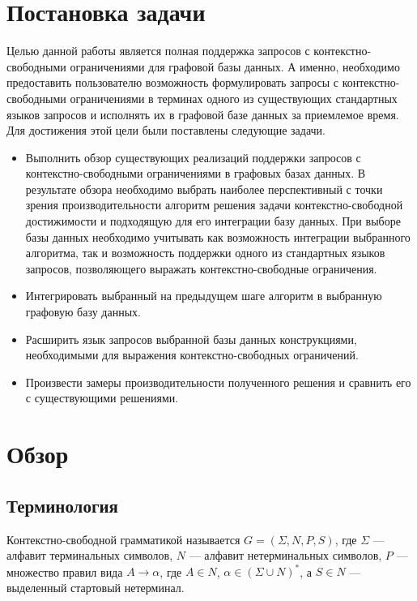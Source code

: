\documentclass[14pt]{matmex-diploma-custom}
\newcommand{\gsv}[1]{\textcolor{red}{#1$^{\text{gsv}}$}}
\begin{document}
\section{Постановка задачи}
Целью данной работы является полная поддержка запросов с конте\-кстно-свободными ограничениями для графовой базы данных. А именно, необходимо предоставить пользователю возможность формулировать запросы с контекстно-свободными ограничениями в терминах одного из существующих стандартных языков запросов и исполнять их в графовой базе данных за приемлемое время. Для достижения этой цели были поставлены следующие задачи.

\begin{itemize}
    \item Выполнить обзор существующих реализаций поддержки запросов с контекстно-свободными ограничениями в графовых базах данных. В результате обзора необходимо выбрать наиболее перспективный с точки зрения производительности алгоритм решения задачи контекстно-свободной достижимости и подходящую для его интеграции базу данных. При выборе базы данных необходимо учитывать как возможность интеграции выбранного алгоритма, так и возможность поддержки одного из стандартных языков запросов, позволяющего выражать контекстно-свободные ограничения.
    \item Интегрировать выбранный на предыдущем шаге алгоритм в выбранную графовую базу данных.
    \item Расширить язык запросов выбранной базы данных конструкциями, необходимыми для выражения контекстно-свободных ограничений.
    \item Произвести замеры производительности полученного решения и сравнить его с существующими решениями.
\end{itemize}


\section{Обзор}

\subsection{Терминология}
Контекстно-свободной грамматикой называется $G = (\Sigma, N, P, S)$, где $\Sigma$ --- алфавит терминальных символов, $N$ --- алфавит нетерминальных символов, $P$ --- множество правил вида $A \rightarrow \alpha$, где $A \in N$, $\alpha \in (\Sigma \cup N)^*$, а $S \in N$ --- выделенный стартовый нетерминал.

\end{document}
